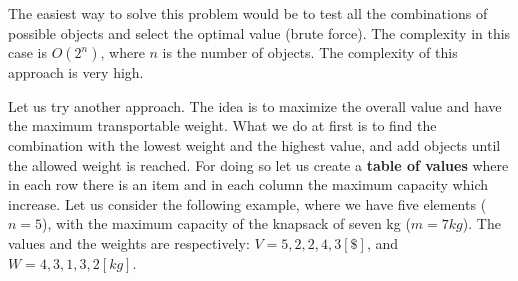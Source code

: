 The easiest way to solve this problem would be to test all the combinations of possible objects and select the optimal value (brute force). The complexity in this case is \(O(2^{n})\), where \(n\) is the number of objects. The complexity of this approach is very high.

Let us try another approach. The idea is to maximize the overall value and have the maximum transportable weight. What we do at first is to find the combination with the lowest weight and the highest value, and add objects until the allowed weight is reached. For doing so let us create a \textbf{table of values} where in each row there is an item and in each column the maximum capacity which increase. Let us consider the following example, where we have five elements (\(n=5\)), with the maximum capacity of the knapsack of seven kg (\(m=7kg\)). The values and the weights are respectively: \(V={5, 2, 2, 4, 3}[\$]\), and \(W={4, 3, 1, 3, 2}[kg]\).

